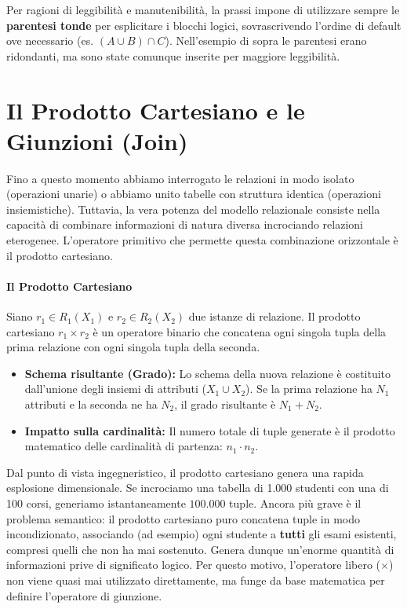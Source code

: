 Per ragioni di leggibilità e manutenibilità, la prassi impone di utilizzare sempre le \textbf{parentesi tonde} per esplicitare i blocchi logici, sovrascrivendo l'ordine di default ove necessario (es. $(A \cup B) \cap C$). Nell'esempio di sopra le parentesi erano ridondanti, ma sono state comunque inserite per maggiore leggibilità.

\section{Il Prodotto Cartesiano e le Giunzioni (Join)}

Fino a questo momento abbiamo interrogato le relazioni in modo isolato (operazioni unarie) o abbiamo unito tabelle con struttura identica (operazioni insiemistiche). Tuttavia, la vera potenza del modello relazionale consiste nella capacità di combinare informazioni di natura diversa incrociando relazioni eterogenee. L'operatore primitivo che permette questa combinazione orizzontale è il prodotto cartesiano.

\paragraph{Il Prodotto Cartesiano}
Siano $r_1 \in R_1(X_1)$ e $r_2 \in R_2(X_2)$ due istanze di relazione. Il prodotto cartesiano $r_1 \times r_2$ è un operatore binario che concatena ogni singola tupla della prima relazione con ogni singola tupla della seconda.

\begin{itemize}
    \item \textbf{Schema risultante (Grado):} Lo schema della nuova relazione è costituito dall'unione degli insiemi di attributi ($X_1 \cup X_2$). Se la prima relazione ha $N_1$ attributi e la seconda ne ha $N_2$, il grado risultante è $N_1 + N_2$.
    \item \textbf{Impatto sulla cardinalità:} Il numero totale di tuple generate è il prodotto matematico delle cardinalità di partenza: $n_1 \cdot n_2$. 
\end{itemize}

\begin{observation}
Dal punto di vista ingegneristico, il prodotto cartesiano genera una rapida esplosione dimensionale. Se incrociamo una tabella di 1.000 studenti con una di 100 corsi, generiamo istantaneamente $100.000$ tuple.
Ancora più grave è il problema semantico: il prodotto cartesiano puro concatena tuple in modo incondizionato, associando (ad esempio) ogni studente a \textbf{tutti} gli esami esistenti, compresi quelli che non ha mai sostenuto. Genera dunque un'enorme quantità di informazioni prive di significato logico. Per questo motivo, l'operatore libero ($\times$) non viene quasi mai utilizzato direttamente, ma funge da base matematica per definire l'operatore di giunzione.
\end{observation}

